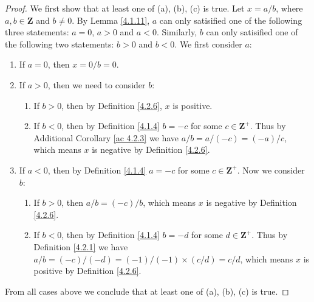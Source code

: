 \begin{proof}
    We first show that at least one of (a), (b), (c) is true.
    Let \(x = a / b\), where \(a, b \in \mathbf{Z}\) and \(b \neq 0\).
    By Lemma \ref{4.1.11}, \(a\) can only satisified one of the following three statements:
    \(a = 0\), \(a > 0\) and \(a < 0\).
    Similarly, \(b\) can only satisified one of the following two statements:
    \(b > 0\) and \(b < 0\).
    We first consider \(a\):
    \begin{enumerate}[label=(\Roman*)]
        \item If \(a = 0\), then \(x = 0 / b = 0\).
        \item If \(a > 0\), then we need to consider \(b\):
              \begin{enumerate}[label=(\roman*)]
                  \item If \(b > 0\), then by Definition \ref{4.2.6}, \(x\) is positive.
                  \item If \(b < 0\), then by Definition \ref{4.1.4} \(b = -c\) for some \(c \in \mathbf{Z}^+\).
                        Thus by Additional Corollary \ref{ac 4.2.3} we have \(a / b = a / (-c) = (-a) / c\), which means \(x\) is negative by Definition \ref{4.2.6}.
              \end{enumerate}
        \item If \(a < 0\), then by Definition \ref{4.1.4} \(a = -c\) for some \(c \in \mathbf{Z}^+\).
              Now we consider \(b\):
              \begin{enumerate}[label=(\roman*)]
                  \item If \(b > 0\), then \(a / b = (-c) / b\), which means \(x\) is negative by Definition \ref{4.2.6}.
                  \item If \(b < 0\), then by Definition \ref{4.1.4} \(b = -d\) for some \(d \in \mathbf{Z}^+\).
                        Thus by Definition \ref{4.2.1} we have \(a / b = (-c) / (-d) = (-1) / (-1) \times (c / d) = c / d\), which means \(x\) is positive by Definition \ref{4.2.6}.
              \end{enumerate}
    \end{enumerate}
    From all cases above we conclude that at least one of (a), (b), (c) is true.


\end{proof}
